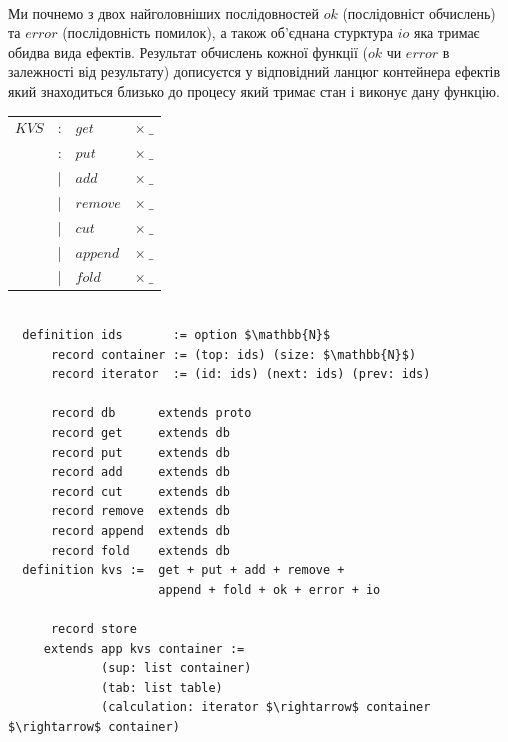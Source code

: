 \documentclass[11pt,oneside]{article}
\begin{document}
   \paragraph{}
   Ми почнемо з двох найголовніших послідовностей $ok$ (послідовніст обчислень)
   та $error$ (послідовність помилок), а також об’єднана стурктура $io$ яка тримає
   обидва вида ефектів. Результат обчислень кожної функції ($ok$ чи $error$ в залежності від результату)
   дописуєтся у відповідний ланцюг контейнера ефектів який знаходиться близько до
   процесу який тримає стан і виконує дану функцію.

\begin{center}
\begin{tabular}{llll}
$KVS$     &:& $get$    & $\times\ \_$          \\
          &:& $put$     & $\times\ \_$          \\
          &|& $add$     & $\times\ \_$          \\
          &|& $remove$  & $\times\ \_$          \\
          &|& $cut$     & $\times\ \_$          \\
          &|& $append$  & $\times\ \_$          \\
          &|& $fold$    & $\times\ \_$         \\
\end{tabular}
\end{center}

\begin{center}
\begin{lstlisting}[mathescape=true]

  definition ids       := option $\mathbb{N}$
      record container := (top: ids) (size: $\mathbb{N}$)
      record iterator  := (id: ids) (next: ids) (prev: ids)

      record db      extends proto
      record get     extends db
      record put     extends db
      record add     extends db
      record cut     extends db
      record remove  extends db
      record append  extends db
      record fold    extends db
  definition kvs :=  get + put + add + remove +
                     append + fold + ok + error + io

      record store
     extends app kvs container :=
             (sup: list container)
             (tab: list table)
             (calculation: iterator $\rightarrow$ container $\rightarrow$ container)

\end{lstlisting}
\end{center}
\end{document}
